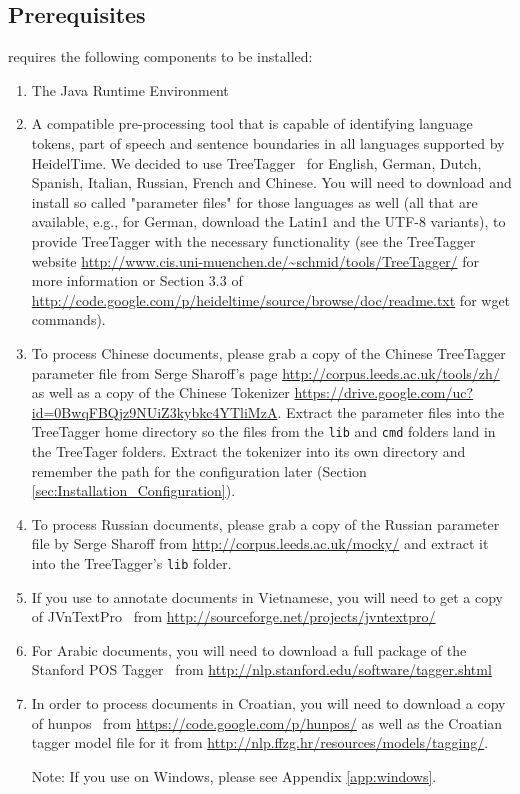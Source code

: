 \subsection{Prerequisites}\label{sec:Installation_Prerequisites}
\product{} requires the following components to be installed:
\begin{enumerate}
\item The Java Runtime Environment~\cite{Java}
\item A compatible pre-processing tool that is capable of identifying language tokens, part of speech and sentence boundaries in all languages supported by HeidelTime. We decided to use TreeTagger~\cite{Schmid1994} for English, German, Dutch, Spanish, Italian, Russian, French and Chinese. You will need to download and install so called "parameter files" for those languages as well (all that are available, e.g., for German, download the Latin1 and the UTF-8 variants), to provide TreeTagger with the necessary functionality (see the TreeTagger website \url{http://www.cis.uni-muenchen.de/~schmid/tools/TreeTagger/} for more information or Section 3.3 of \url{http://code.google.com/p/heideltime/source/browse/doc/readme.txt} for wget commands).
\item To process Chinese documents, please grab a copy of the Chinese TreeTagger parameter file from Serge Sharoff's page \url{http://corpus.leeds.ac.uk/tools/zh/} as well as a copy of the Chinese Tokenizer \url{https://drive.google.com/uc?id=0BwqFBQjz9NUiZ3kybkc4YTliMzA}. Extract the parameter files into the TreeTagger home directory so the files from the \texttt{lib} and \texttt{cmd} folders land in the TreeTager folders. Extract the tokenizer into its own directory and remember the path for the configuration later (Section \ref{sec:Installation_Configuration}).
\item To process Russian documents, please grab a copy of the Russian parameter file by Serge Sharoff from \url{http://corpus.leeds.ac.uk/mocky/} and extract it into the TreeTagger's \texttt{lib} folder.
\item If you use \product{} to annotate documents in Vietnamese, you will need to get a copy of JVnTextPro~\cite{JVnTextPro} from \url{http://sourceforge.net/projects/jvntextpro/}
\item For Arabic documents, you will need to download a full package of the Stanford POS Tagger~\cite{ToutanovaEtAl2003} from \url{http://nlp.stanford.edu/software/tagger.shtml}
\item In order to process documents in Croatian, you will need to download a copy of hunpos~\cite{HalacsyEtAl2007} from \url{https://code.google.com/p/hunpos/} as well as the Croatian tagger model file for it from \url{http://nlp.ffzg.hr/resources/models/tagging/}.

Note: If you use \product{} on Windows, please see Appendix \ref{app:windows}.
\end{enumerate}

